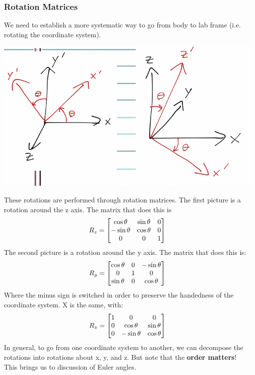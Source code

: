\documentclass[../PHYS306Notes.tex]{subfiles}
\begin{document}
\subsubsection{Rotation Matrices}
We need to establish a more systematic way to go from body to lab frame (i.e. rotating the coordinate system). 
\begin{center}
    \includegraphics[scale=0.5]{Lecture-20/l20-img7.png}
\end{center}
These rotations are performed through rotation matrices. The first picture is a rotation around the z axis. The matrix that does this is
\[R_z = \begin{bmatrix}\cos\theta & \sin\theta & 0 \\ -\sin\theta & \cos\theta & 0 \\ 0 & 0 & 1\end{bmatrix}\]
The second picture is a rotation around the y axis. The matrix that does this is:
\[R_y = \begin{bmatrix}\cos\theta & 0 & -\sin\theta \\ 0 & 1 & 0 \\ \sin\theta & 0 & \cos\theta\end{bmatrix}\]
Where the minus sign is switched in order to preserve the handedness of the coordinate system. X is the same, with:
\[R_x = \begin{bmatrix}1 & 0 & 0 \\ 0 & \cos\theta & \sin\theta \\ 0 & -\sin\theta & \cos\theta\end{bmatrix}\]
In general, to go from one coordinate system to another, we can decompose the rotations into rotations about x, y, and z. But note that the \textbf{order matters}! This brings us to discussion of Euler angles.
\end{document}
